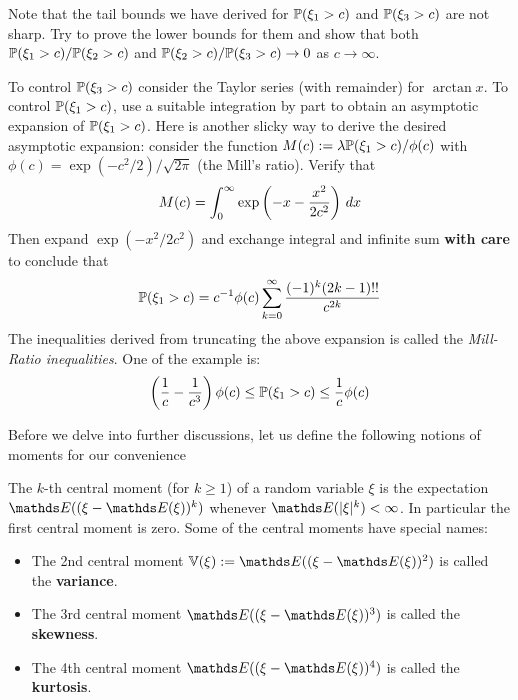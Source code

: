 \begin{unexaminable}
\begin{exercise}
Note that the tail bounds we have derived for $\mathbb{P}(\xi_1 > c)$ and $\mathbb{P}(\xi_3 > c)$ are not sharp. Try to prove the lower bounds for them and show that both $\mathbb{P}(\xi_1 > c)/\mathbb{P}(\xi_2 > c)$ and $\mathbb{P}(\xi_2 > c) / \mathbb{P}(\xi_3 > c) \to 0$ as $c \to \infty$.
\end{exercise}

\begin{hint}
To control $\mathbb{P}(\xi_3 > c)$ consider the Taylor series (with remainder) for $\arctan{x}$. To control $\mathbb{P}(\xi_1 > c)$, use a suitable integration by part to obtain an asymptotic expansion of $\mathbb{P}(\xi_1 > c)$. Here is another slicky way to derive the desired asymptotic expansion: consider the function $M(c) := \lambda \mathbb{P}(\xi_1 > c) / \phi(c)$ with $\phi(c) = \exp(-c^2/2)/\sqrt{2\pi}$ (the Mill's ratio). Verify that
\begin{equation}
    M(c) = \int_0^\infty \exp\left( -x - \frac{x^2}{2c^2} \right) \, dx
\end{equation}
Then expand $\exp(-x^2/2c^2)$ and exchange integral and infinite sum \textbf{with care} to conclude that
\begin{equation} \label{eq:Mill_expansion}
    \mathbb{P}(\xi_1 > c) = c^{-1} \phi(c) \sum_{k=0}^\infty \frac{(-1)^k (2k-1)!!}{c^{2k}}
\end{equation}
The inequalities derived from truncating the above expansion is called the \textit{Mill-Ratio inequalities}. One of the example is:
\begin{equation} \label{eq:Mill_Ratio_basic}
    \left( \frac{1}{c} - \frac{1}{c^3} \right) \phi(c) \leq \mathbb{P}(\xi_1 > c) \leq \frac{1}{c} \phi(c)
\end{equation}
\end{hint}
\end{unexaminable}

Before we delve into further discussions, let us define the following notions of moments for our convenience

\begin{definition}
The $k$-th central moment (for $k \geq 1$) of a random variable $\xi$ is the expectation $\E((\xi - \E(\xi))^k)$ whenever $\E(|\xi|^k) < \infty$. In particular the first central moment is zero.
Some of the central moments have special names:
\begin{itemize}
    \item The 2nd central moment $\V(\xi) := \E((\xi-\E(\xi))^2)$ is called the \textbf{variance}.
    \item The 3rd central moment $\E((\xi-\E(\xi))^3)$ is called the \textbf{skewness}.
    \item The 4th central moment $\E((\xi-\E(\xi))^4)$ is called the \textbf{kurtosis}.
\end{itemize}
\end{definition}

